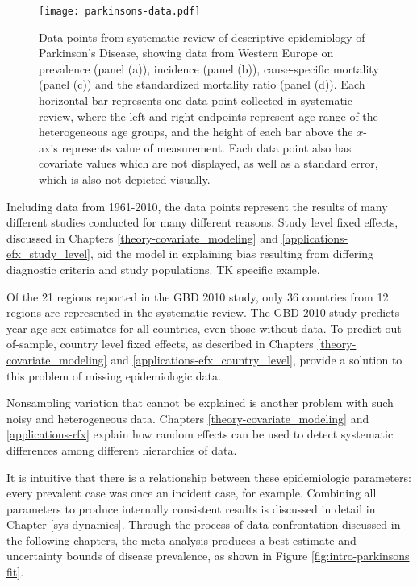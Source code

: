     \begin{figure}[h]
        \begin{center}
            \texttt{[image: parkinsons-data.pdf]}
            \caption{Data points from systematic review of descriptive
              epidemiology of Parkinson's Disease, showing data from
              Western Europe on prevalence (panel (a)), incidence
              (panel (b)), cause-specific mortality (panel (c)) and
              the standardized mortality ratio (panel (d)).  Each
              horizontal bar represents one data point collected in
              systematic review, where the left and right endpoints
              represent age range of the heterogeneous age groups, and
              the height of each bar above the $x$-axis represents
              value of measurement.  Each data point also has
              covariate values which are not displayed, as well as a
              standard error, which is also not depicted visually.}
            \label{fig:intro-parkinsons data}
        \end{center}
    \end{figure}

Including data from 1961-2010, the data points represent the results
of many different studies conducted for many different reasons.  Study
level fixed effects, discussed in Chapters
\ref{theory-covariate_modeling} and
\ref{applications-efx_study_level}, aid the model in explaining bias
resulting from differing diagnostic criteria and study populations. TK
specific example.

Of the 21 regions reported in the GBD 2010 study, only 36 countries
from 12 regions are represented in the systematic review.  The GBD
2010 study predicts year-age-sex estimates for all countries, even
those without data.  To predict out-of-sample, country level fixed
effects, as described in Chapters \ref{theory-covariate_modeling} and
\ref{applications-efx_country_level}, provide a solution to this
problem of missing epidemiologic data.

Nonsampling variation that cannot be explained is another problem with
such noisy and heterogeneous data.  Chapters
\ref{theory-covariate_modeling} and \ref{applications-rfx} explain how
random effects can be used to detect systematic differences among
different hierarchies of data.

It is intuitive that there is a relationship between these
epidemiologic parameters: every prevalent case was once an incident
case, for example.  Combining all parameters to produce internally
consistent results is discussed in detail in Chapter
\ref{sys-dynamics}.  Through the process of data confrontation
discussed in the following chapters, the meta-analysis produces a best
estimate and uncertainty bounds of disease prevalence, as shown in
Figure \ref{fig:intro-parkinsons fit}.

